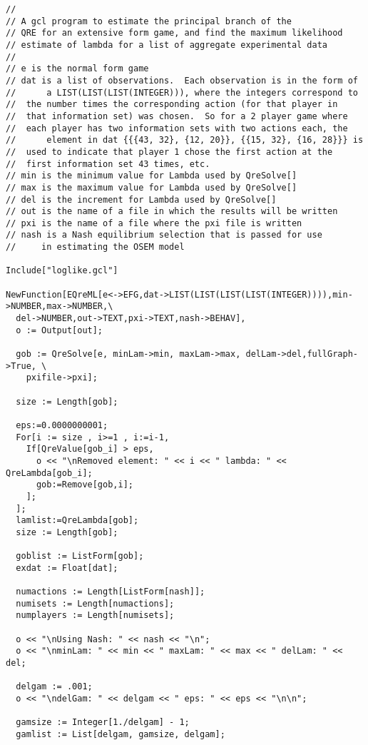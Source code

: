{\scriptsize
\begin{verbatim}
//
// A gcl program to estimate the principal branch of the 
// QRE for an extensive form game, and find the maximum likelihood 
// estimate of lambda for a list of aggregate experimental data
// 
// e is the normal form game
// dat is a list of observations.  Each observation is in the form of  
//      a LIST(LIST(LIST(INTEGER))), where the integers correspond to
//	the number times the corresponding action (for that player in
//	that information set) was chosen.  So for a 2 player game where
//	each player has two information sets with two actions each, the 
//      element in dat {{{43, 32}, {12, 20}}, {{15, 32}, {16, 28}}} is 
//	used to indicate that player 1 chose the first action at the
//	first information set 43 times, etc.  
// min is the minimum value for Lambda used by QreSolve[]
// max is the maximum value for Lambda used by QreSolve[]
// del is the increment for Lambda used by QreSolve[]
// out is the name of a file in which the results will be written
// pxi is the name of a file where the pxi file is written
// nash is a Nash equilibrium selection that is passed for use
//     in estimating the OSEM model 

Include["loglike.gcl"]

NewFunction[EQreML[e<->EFG,dat->LIST(LIST(LIST(LIST(INTEGER)))),min->NUMBER,max->NUMBER,\
  del->NUMBER,out->TEXT,pxi->TEXT,nash->BEHAV],
  o := Output[out];

  gob := QreSolve[e, minLam->min, maxLam->max, delLam->del,fullGraph->True, \
    pxifile->pxi];

  size := Length[gob];

  eps:=0.0000000001;
  For[i := size , i>=1 , i:=i-1,
    If[QreValue[gob_i] > eps, 
      o << "\nRemoved element: " << i << " lambda: " << QreLambda[gob_i];
      gob:=Remove[gob,i]; 
    ];
  ];
  lamlist:=QreLambda[gob];
  size := Length[gob];

  goblist := ListForm[gob];
  exdat := Float[dat];

  numactions := Length[ListForm[nash]];
  numisets := Length[numactions];
  numplayers := Length[numisets];

  o << "\nUsing Nash: " << nash << "\n";
  o << "\nminLam: " << min << " maxLam: " << max << " delLam: " << del;

  delgam := .001;
  o << "\ndelGam: " << delgam << " eps: " << eps << "\n\n";

  gamsize := Integer[1./delgam] - 1;
  gamlist := List[delgam, gamsize, delgam];


\end{verbatim}}
